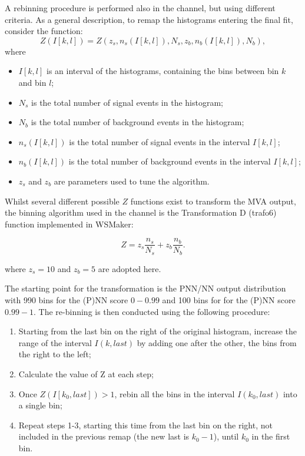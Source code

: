 A rebinning procedure is performed also in the \lephad channel, but using different criteria. 
As a general description, to remap the histograms entering the final fit, consider the function:
\begin{equation}
Z(I[k,l]) = Z(z_{s},n_{s}(I[k,l]),N_{s},z_{b},n_{b}(I[k,l]),N_{b}),
\end{equation}
where
\begin{itemize}
\item $I[k,l]$ is an interval of the histograms, containing the bins between bin $k$ and bin $l$;
\item $N_{s}$ is the total number of signal events in the histogram;
\item $N_{b}$ is the total number of background events in the histogram;
\item $n_{s}(I[k,l])$ is the total number of signal events in the interval $I[k,l]$;
\item $n_{b}(I[k,l])$ is the total number of background events in the interval $I[k,l]$;
\item $z_{s}$ and $z_{b}$ are parameters used to tune the algorithm.
\end{itemize}

Whilst several different possible $Z$ functions exist to transform the MVA output, 
the binning algorithm used in the \lephad channel is the
Transformation D (trafo6) function implemented in WSMaker:

\begin{equation}
Z = z_{s}\frac{n_{s}}{N_{s}} + z_{b}\frac{n_{b}}{N_{b}}.
\end{equation}

where $z_{s}=10$ and $z_{b}=5$ are adopted here. 

The starting point for the transformation is the 
PNN/NN output distribution with 990 bins for the (P)NN score $0-0.99$ and 100 bins for for the (P)NN score $0.99-1$. 
The re-binning is then conducted using the following procedure:
\begin{enumerate}
\item Starting from the last bin on the right of the original histogram, increase the range of the interval $I(k, last)$ by adding one after the other, the bins from the right to the left;
\item Calculate the value of Z at each step;
\item Once $Z(I[k_{0}, last]) > 1$, rebin all the bins in the interval $I(k_{0}, last)$ into a single bin;
\item Repeat steps 1-3, starting this time from the last bin on the right, not included in the previous remap (the new last is $k_{0}-1$), until $k_{0}$ in the first bin.
\end{enumerate}


